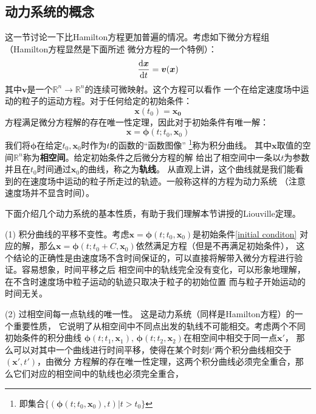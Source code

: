     \subsection{动力系统的概念}
    这一节讨论一下比Hamilton方程更加普遍的情况。考虑如下微分方程组（Hamilton方程显然是下面所述
    微分方程的一个特例）：
    \begin{equation}
        \frac{\mathrm{d}{\bm{x}}}{\mathrm{d}{t}} = \bm{v}(\bm{x})
        \label{dynamical system}
    \end{equation}
    其中$\bm{v}$是一个$\mathbb{R}^{n}\to\mathbb{R}^{n}$的连续可微映射。这个方程可以看作
    一个在给定速度场中运动的粒子的运动方程。对于任何给定的初始条件：
    \begin{equation}
        \bm{x}(t_0) = \bm{x_0}
        \label{initial condition}
    \end{equation}
    方程满足微分方程解的存在唯一性定理\cite{丁同仁2004常微分方程教程}，因此对于初始条件有唯一解：
    \begin{equation}
        \bm{x} = \bm{\phi}(t;t_0, \bm{x}_0)
    \end{equation}
    我们将$\bm{\phi}$在给定$t_0,\bm{x}_0$时作为$t$的函数的“函数图像”
    \footnote{即集合$\{(\bm{\phi}(t;t_0,\bm{x}_0), t)|t>t_0\}$}称为积分曲线。
    其中$\bm{x}$取值的空间$\mathbb{R}^n$称为\textbf{相空间}。给定初始条件之后微分方程的解
    给出了相空间中一条以$t$为参数并且在$t_0$时间通过$\bm{x}_0$的曲线，称之为\textbf{轨线}。
    从直观上讲，这个曲线就是我们能看到的在速度场中运动的粒子所走过的轨迹。一般称这样的方程为动力系统
    （注意速度场并不显含时间）。
    \par 下面介绍几个动力系统的基本性质，有助于我们理解本节讲授的Liouville定理。
    \par (1) 积分曲线的平移不变性。考虑$\bm{x} = \bm{\phi}(t;t_0,\bm{x}_0)$是初始条件\ref{initial conditon}
    对应的解，那么$\bm{x} = \bm{\phi}(t;t_0 + C,\bm{x}_0)$依然满足方程（但是不再满足初始条件），
    这个结论的正确性是由速度场不含时间保证的，可以直接将解带入微分方程进行验证。容易想象，时间平移之后
    相空间中的轨线完全没有变化，可以形象地理解，在不含时速度场中粒子运动的轨迹只取决于粒子的初始位置
    而与粒子开始运动的时间无关。
    \par (2) 过相空间每一点轨线的唯一性。 这是动力系统（同样是Hamilton方程）的一个重要性质，
    它说明了从相空间中不同点出发的轨线不可能相交。考虑两个不同初始条件的积分曲线
    $\bm{\phi}(t;t_1,\bm{x}_1),\, \bm{\phi}(t; t_2, \bm{x}_2)$在相空间中相交于同一点$\bm{x}'$，
    那么可以对其中一个曲线进行时间平移，使得在某个时刻$t'$两个积分曲线相交于$(\bm{x}', t')$，由微分
    方程解的存在唯一性定理，这两个积分曲线必须完全重合，那么它们对应的相空间中的轨线也必须完全重合，

